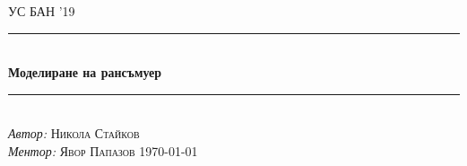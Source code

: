 \documentclass[11pt, a4paper]{article}
\theoremstyle{definition}
\begin{document}
\begin{titlepage}
	\newcommand{\HRule}{\rule{\linewidth}{0.5mm}}
	\centering
	\textsc{\LARGE УС БАН '19}\\[1cm]
	\HRule\\[1 cm]
	
	{\huge\bfseries Моделиране на рансъмуер }\\[0.5 cm] 
	\HRule\\
    \vfill
			\Large
			\textit{Автор:}
			 \textsc{Никола Стайков}\\
             \vspace{2cm}
			\Large
			\textit{Ментор:}
            \textsc{Явор Папазов}
    \vfill	
	{\large\today}   
	\vfill
\end{titlepage}

\tableofcontents
\newpage
\begin{abstract}
		Рансъмуер е вид компютърен вирус, който критптира файловете на дадена система и изисква да бъде платен откуп, за да бъдат декриптирани. Приемаме, че създателите на рансъмуер не знаят цената на данните на техните жертви, или по-точно колко техните жертви $\dq \text{мислят} \dq$ , че струват данните им. Те могат да правят малки проучвания преди да започнат основната кампания с цел да определят гореспоменатото разпределение. Този проект разглежда модел, чрез който да бъдат определени оптималните параметри за едно такова проучване. Този подход е ключов за намирането на оптималната цена за откупа.
\end{abstract}
\end{document}
